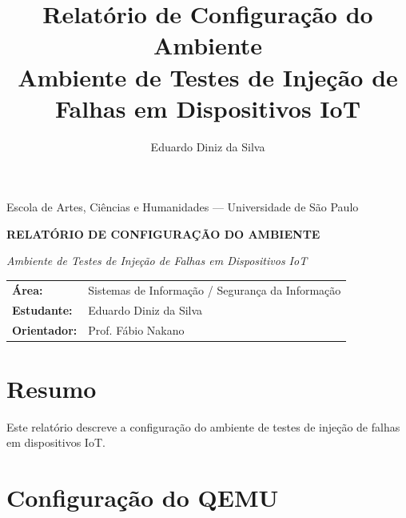 \documentclass[12pt,a4paper]{article}
\title{
    \textbf{Relatório de Configuração do Ambiente}\\[0.3cm]
    \large Ambiente de Testes de Injeção de Falhas em Dispositivos IoT
}
\author{Eduardo Diniz da Silva}
\date{}
\begin{document}

\begin{center}
    
    \large
    Escola de Artes, Ciências e Humanidades --- Universidade de São Paulo

    \vspace{1.5cm}

    \Large
    \textbf{RELATÓRIO DE CONFIGURAÇÃO DO AMBIENTE}

    \vspace{0.3cm}

    \large
    \textit{Ambiente de Testes de Injeção de Falhas em Dispositivos IoT}

    \vspace{1cm}

    \normalsize

    \begin{tabular}{ll}
        \textbf{Área:} & Sistemas de Informação / Segurança da Informação \\
        \textbf{Estudante:} & Eduardo Diniz da Silva \\
        \textbf{Orientador:} & Prof. Fábio Nakano
    \end{tabular}

\end{center}


\section{Resumo}

Este relatório descreve a configuração do ambiente de testes de injeção de falhas em dispositivos IoT.



\section{Configuração do QEMU}
\end{document}
